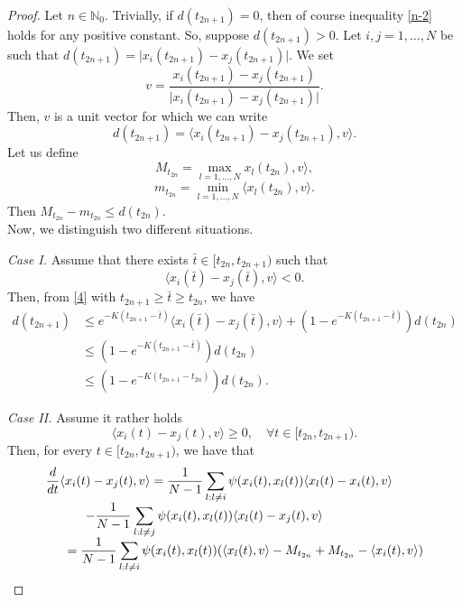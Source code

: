 \documentclass[a4paper,11pt,oneside]{article}
\begin{document}
	\begin{proof}
		Let $n\in \mathbb{N}_{0}$. Trivially, if $d(t_{2n+1})=0$, then of course inequality \eqref{n-2} holds for any positive constant. So, suppose $d(t_{2n+1})>0$. Let $i,j=1,\dots,N$ be such that $d(t_{2n+1})=\lvert x_{i}(t_{2n+1})-x_{j}(t_{2n+1})\rvert$. We set $$v=\frac{x_{i}(t_{2n+1})-x_{j}(t_{2n+1})}{\lvert x_{i}(t_{2n+1})-x_{j}(t_{2n+1})\rvert}.$$
		Then, $v$ is a unit vector for which we can write $$d(t_{2n+1})=\langle x_{i}(t_{2n+1})-x_{j}(t_{2n+1}),v\rangle.$$
		Let us define $$M_{t_{2n}}=\max_{l=1,\dots,N} x_{l}(t_{2n}),v\rangle,$$
		$$m_{t_{2n}}=\min_{l=1,\dots,N}\langle x_{l}(t_{2n}),v\rangle.$$
		Then $M_{t_{2n}}-m_{t_{2n}}\leq d(t_{2n})$. 
		\\Now, we distinguish two different situations.
		\par\textit{Case I.} Assume that there exists $\bar{t}\in [t_{2n},t_{2n+1})$ such that 
		$$\langle x_{i}(\bar{t})-x_{j}(\bar{t}),v\rangle<0.$$
		Then, from \eqref{4} with $t_{2n+1}\geq \bar{t}\geq t_{2n}$, we have \begin{equation}\label{t0}
			\begin{split}
				d(t_{2n+1})&\leq e^{-K(t_{2n+1}-\bar{t})}\langle x_{i}(\bar{t})-x_{j}(\bar{t}),v\rangle+(1-e^{-K(t_{2n+1}-\bar{t})})d(t_{2n})\\&\leq (1-e^{-K(t_{2n+1}-\bar{t})})d(t_{2n})\\&\leq (1-e^{-K(t_{2n+1}-t_{2n})})d(t_{2n}).
			\end{split}
		\end{equation}
		\par\textit{Case II.} Assume it rather holds \begin{equation}\label{pos}
			\langle x_{i}(t)-x_{j}(t),v\rangle\geq 0,\quad \forall t\in [t_{2n},t_{2n+1}).
		\end{equation}
		Then, for every  $t\in [t_{2n},t_{2n+1})$, we have that 
		$$
		\begin{array}{l}
			\displaystyle{
				\frac{d}{dt}\langle x_{i}(t)-x_{j}(t),v\rangle=\frac{1}{N-1}\sum_{l:l\neq i}\psi(x_{i}(t),x_{l}(t))\langle x_{l}(t)-x_{i}(t),v\rangle}\\
			\displaystyle{\hspace{1.1cm}-\frac{1}{N-1}\sum_{l:l\neq j}\psi(x_{i}(t),x_{l}(t))\langle x_{l}(t)-x_{j}(t),v\rangle}\\
			\displaystyle{\hspace{0.6cm}=\frac{1}{N-1}\sum_{l:l\neq i}\psi(x_{i}(t),x_{l}(t))(\langle x_{l}(t),v\rangle-M_{t_{2n}}+M_{t_{2n}}-\langle x_{i}(t),v\rangle)}\\

\end{array}$$
\end{proof}
\end{document}
